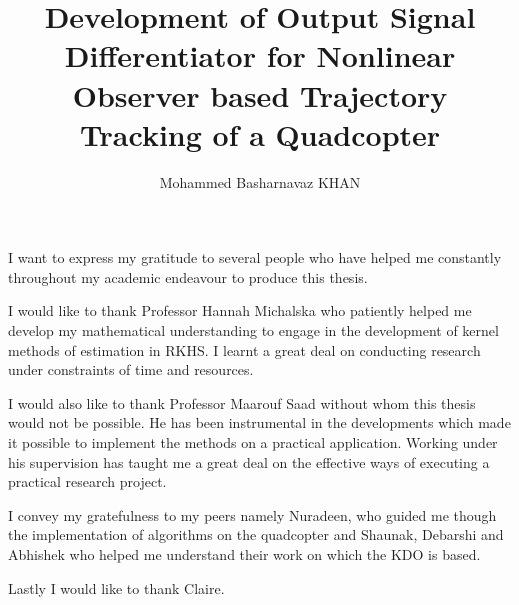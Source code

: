 \documentclass[letterpaper%
, twoside%
, 12pt%
,memoire%
, english%
,creativecommons,hyperref%
]{thETS}
\title{Development of Output Signal Differentiator for Nonlinear Observer based Trajectory Tracking of a Quadcopter}
\author{Mohammed Basharnavaz KHAN}
\begin{document}
\maketitle
\presentjury


\begin{acknowledgements}
I want to express my gratitude to several people who have helped me constantly throughout my academic endeavour to produce this thesis.

I would like to thank Professor Hannah Michalska who patiently helped me develop my mathematical understanding to engage in the development of kernel methods of estimation in RKHS. I learnt a great deal on conducting research under constraints of time and resources.

I would also like to thank Professor Maarouf Saad without whom this thesis would not be possible. He has been instrumental in the developments which made it possible to implement the methods on a practical application. Working under his supervision has taught me a great deal on the effective ways of executing a practical research project.

I convey my gratefulness to my peers namely Nuradeen, who guided me though the implementation of algorithms on the quadcopter and Shaunak, Debarshi and Abhishek who helped me understand their work on which the KDO is based. 

Lastly I would like to thank Claire. 
\end{acknowledgements}
\end{document}
